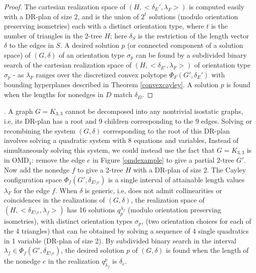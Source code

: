 \begin{proof}
    The cartesian realization
    space of $(H,<\delta_E', \lambda_F>)$ is
    computed easily with a DR-plan of size 2, and is the union of $2^t$
    solutions (modulo orientation preserving isometries) each with a distinct orientation type, where $t$ is the number of triangles in the 2-tree
    $H$;
    here $\delta_{S}$ is the restriction of the length vector $\delta$ to
    the edges in $S$.
    A desired solution $p$ (or connected component of a solution space)
    of $(G,\delta)$
    of an orientation type $\sigma_p$ can be found
    by a subdivided binary search   of the cartesian realization space of
    $(H, <\delta_{E'},\lambda_F>)$ of orientation type $\sigma_p$ -
    as $\lambda_F$ ranges over
    the discretized convex
    polytope $\Phi_F(G',\delta_E')$ with bounding hyperplanes described in
    Theorem \ref{convexcayley}.
    A solution $p$  is found  when the lengths for nonedges in $D$ match
    $\delta_D$.
\end{proof}



\medskip{}.
A graph $G=K_{3,3}$  cannot be decomposed into any nontrivial isostatic
graphs, i.e, its DR-plan has a root and 9
children corresponding to the 9 edges. Solving or recombining the system
$(G,\delta)$
corresponding to the root of
this DR-plan involves solving a quadratic system with 8 equations and variables,
Instead of simultaneously solving this system, we could instead use the fact
that $G=K_{3,3}$ is in OMD$_1$: remove the
edge $e$ in Figure \ref{omdexample} to give a partial 2-tree $G'$.
Now add the nonedge $f$ to give a 2-tree $H$ with a DR-plan of size 2.
The Cayley configuration space $\Phi_f(G', \delta_{E\setminus e})$
is a single interval of attainable length values $\lambda_F$ for
the edge $f$.
When $\delta$ is generic, i.e, does not admit collinearities or coincidences
in the realizations of $(G,\delta)$,
the realization space of $(H, <\delta_{E\setminus e}, \lambda_f>)$ has 16
solutions $q_p^{\lambda_f}$ (modulo orientation preserving isometries),
with distinct orientation types $\sigma_p$,
(two orientation choices for each of the 4 triangles)
that can be obtained by solving a sequence of 4 single quadratics in 1
variable (DR-plan of size 2).
By subdivided
binary search
in the interval $\lambda_f \in
\Phi_f(G', \delta_{E\setminus e})$, the desired
solution $p$  of $(G,\delta)$ is found when the length of the nonedge
$e$ in  the realization
$q^p_{\lambda_f}$
is $\delta_e$.
%
